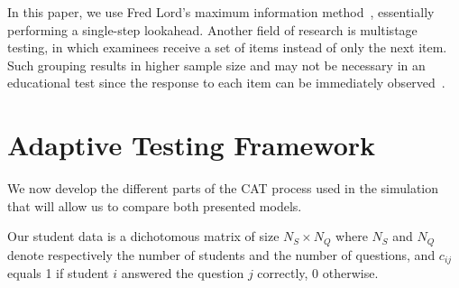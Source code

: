 \documentclass{edm_template}
\begin{document}
In this paper, we use Fred Lord's maximum information method~\cite{Lord1980}, essentially performing a single-step lookahead. Another field of research is multistage testing, in which examinees receive a set of items instead of only the next item. Such grouping results in higher sample size and may not be necessary in an educational test since the response to each item can be immediately observed~\cite{Chang2014}. %


\section{Adaptive Testing Framework}

We now develop the different parts of the CAT process used in the simulation that will allow us to compare both presented models.

Our student data is a dichotomous matrix of size $N_S \times N_Q$ where $N_S$ and $N_Q$ denote respectively the number of students and the number of questions, and $c_{ij}$ equals 1 if student $i$ answered the question $j$ correctly, 0 otherwise. 
\end{document}
